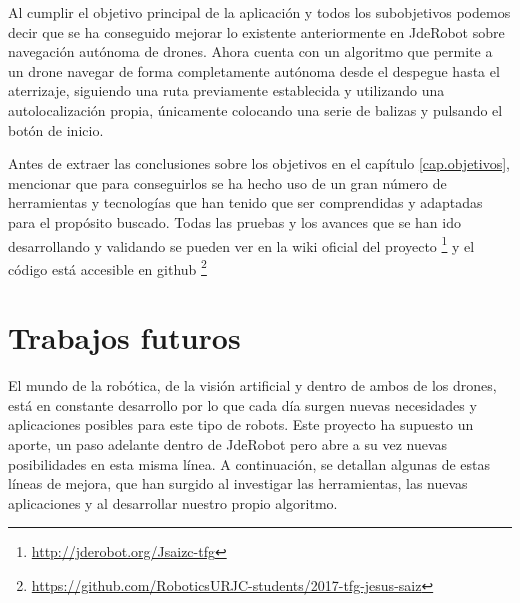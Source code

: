\hspace{1cm} Al cumplir el objetivo principal de la aplicación y todos los subobjetivos podemos decir que se ha conseguido mejorar lo existente anteriormente en JdeRobot sobre navegación autónoma de drones. Ahora cuenta con un algoritmo que permite a un drone navegar de forma completamente autónoma desde el despegue hasta el aterrizaje, siguiendo una ruta previamente establecida y utilizando una autolocalización propia, únicamente colocando una serie de balizas y pulsando el botón de inicio.

\hspace{1cm} Antes de extraer las conclusiones sobre los objetivos en el capítulo \ref{cap.objetivos}, mencionar que para conseguirlos se ha hecho uso de un gran número de herramientas y tecnologías que han tenido que ser comprendidas y adaptadas para el propósito buscado. Todas las pruebas y los avances que se han ido desarrollando y validando se pueden ver en la wiki oficial del proyecto \footnote{\url{http://jderobot.org/Jsaizc-tfg}} y el código está accesible en github \footnote{\url{https://github.com/RoboticsURJC-students/2017-tfg-jesus-saiz}} 
\\

\section{Trabajos futuros}
\hspace{1cm} El mundo de la robótica, de la visión artificial y dentro de ambos de los drones, está en constante desarrollo por lo que cada día surgen nuevas necesidades y aplicaciones posibles para este tipo de robots. Este proyecto ha supuesto un aporte, un paso adelante dentro de JdeRobot pero abre a su vez nuevas posibilidades en esta misma línea. A continuación, se detallan algunas de estas líneas de mejora, que han surgido al investigar las herramientas, las nuevas aplicaciones y al desarrollar nuestro propio algoritmo.

